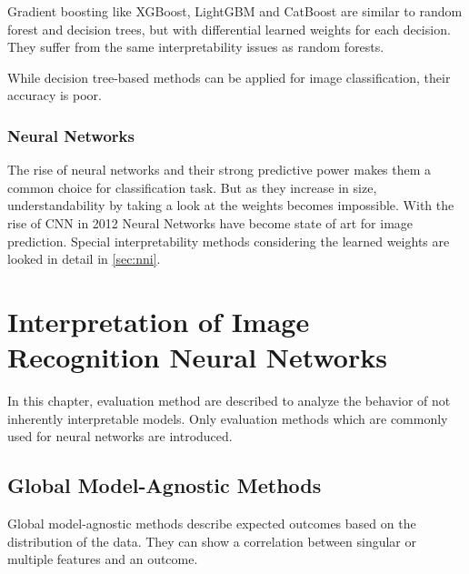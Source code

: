 Gradient boosting like XGBoost, LightGBM and CatBoost are similar to random forest and decision trees, but with differential learned weights for each decision. They suffer from the same interpretability issues as random  forests.

While decision tree-based methods can be applied for image classification, their accuracy is poor.


\subsection{Neural Networks}

The rise of neural networks and their strong predictive power makes them a common choice for classification task. But as they increase in size, understandability by taking a look at the weights becomes impossible. With the rise of CNN in 2012  \cite{krizhevsky2012nn} Neural Networks have become state of art for image prediction. Special interpretability methods considering the learned weights are looked in detail in \ref{sec:nni}.


\chapter{Interpretation of Image Recognition Neural Networks}

In this chapter, evaluation method are described to analyze the behavior of not inherently interpretable models. Only evaluation methods which are commonly used for neural networks are introduced.

\section{Global Model-Agnostic Methods}

Global model-agnostic methods describe expected outcomes based on the distribution of the data. They can show a correlation between singular or multiple features and an outcome.

